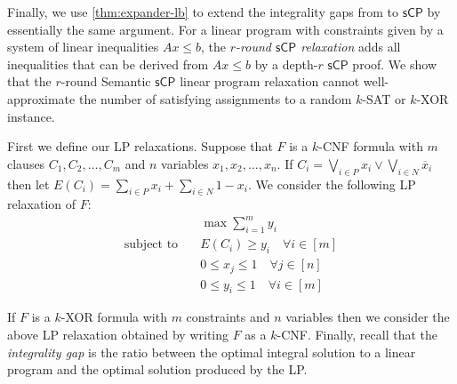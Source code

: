 \documentclass[11pt]{article}
\numberwithin{equation}{section}
\theoremstyle{definition}
\theoremstyle{plain}
\newcommand{\sCP}{\ensuremath{\mathsf{sCP}}}
\begin{document}
Finally, we use \autoref{thm:expander-lb} to extend the integrality gaps from \cite{BGHMP06} to $\sCP$ by essentially the same argument. 
For a linear program with constraints given by a system of linear inequalities $Ax \leq b$, the \emph{$r$-round $\sCP$ relaxation} adds all inequalities that can be derived from $Ax \leq b$ by a depth-$r$ $\sCP$ proof.
We show that the $r$-round Semantic $\sCP$ linear program relaxation cannot well-approximate the number of satisfying assignments to a random $k$-SAT or $k$-XOR instance. 

First we define our LP relaxations.
Suppose that $F$ is a $k$-CNF formula with $m$ clauses $C_1, C_2, \ldots, C_m$ and $n$ variables $x_1, x_2, \ldots, x_n$.
If $C_i = \bigvee_{i \in P} x_i \vee \bigvee_{i \in N} \overline x_i$ then let $E(C_i) = \sum_{i \in P} x_i + \sum_{i \in N} 1-x_i$.
We consider the following LP relaxation of $F$:
\begin{align*}
	& \max \sum_{i=1}^m y_i \\
	\text{subject to}\quad & E(C_i) \geq y_i \quad \forall i \in [m]\\
	& 0 \leq x_j \leq 1 \quad \forall j \in [n] \\
	& 0 \leq y_i \leq 1 \quad \forall i \in [m]
\end{align*}

If $F$ is a $k$-XOR formula with $m$ constraints and $n$ variables then we consider the above LP relaxation obtained by writing $F$ as a $k$-CNF.
Finally, recall that the \emph{integrality gap} is the ratio between the optimal integral solution to a linear program and the optimal solution produced by the LP. 
\end{document}
